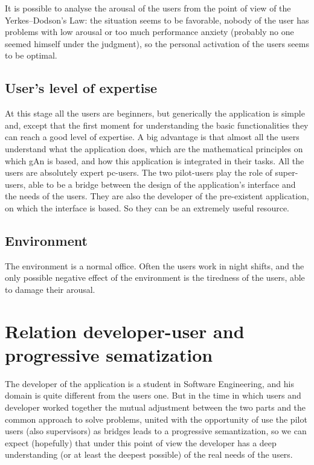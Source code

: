 It is possible to analyse the arousal of the users from the point of view of the Yerkes–Dodson's Law: the situation seems to be favorable, nobody of the user 
has problems with low arousal or too much performance anxiety (probably no one seemed himself under the judgment), so the personal activation of the users seems to be optimal.

\subsection{User's level of expertise }
At this stage all the users are beginners, but generically the application is simple and, except that the first moment for understanding the basic functionalities they can reach a good level of expertise. A big advantage is that almost all the users understand what the application does, which are the mathematical principles on which gAn is based, and how this application is integrated in their tasks.   
All the users are absolutely expert pc-users.
The two pilot-users play the role of super-users, able to be a bridge between the design of the application's interface and the needs of the users. They are also the developer of the pre-existent application, on which the interface is based. So they can be an extremely useful resource.  


\subsection{Environment}
The environment is a normal office. Often the users work in night shifts, and the only possible negative effect of the environment is the tiredness of the users, able to damage their arousal. 

\section{Relation developer-user and progressive sematization}
The developer of the application is a student in Software Engineering, and his domain is quite different from the users one. But in the time in which users and developer worked together the mutual adjustment between the two parts and the common approach to solve problems, united with the opportunity of use the pilot users (also supervisors) as bridges leads to a progressive semantization, so we can expect (hopefully) that under this point of view the developer has a deep understanding (or at least the deepest possible) of the real needs of the users.

